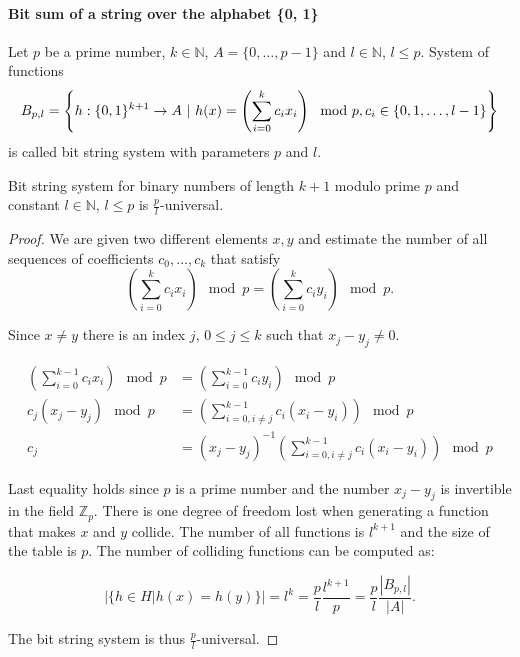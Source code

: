 \paragraph{Bit sum of a string over the alphabet \{0, 1\}}
\begin{definition}
Let $p$ be a prime number, $k \in \mathbb{N}$, $A = \{0, \dots, p - 1 \}$ and $l \in \mathbb{N}$, $l \leq p$. System of functions
\begin{displaymath}
B_{p, l} = \left\{ h: \{0, 1\}^{k + 1} \rightarrow A \ | \  h(x) = \left(\displaystyle \sum_{i=0}^{k} c_i x_i\right) \mod p, c_i \in \{0, 1, \dots, l - 1\} \right\}
\end{displaymath} 
is called bit string system with parameters $p$ and $l$.
\end{definition}

\begin{remark}
Bit string system for binary numbers of length $k + 1$ modulo prime $p$ and constant $l \in \mathbb{N}$, $l \leq p$ is $\frac{p}{l}$-universal.
\end{remark}
\begin{proof}
We are given two different elements $x, y$ and estimate the number of all sequences of coefficients $c_0, \dots, c_k$ that satisfy
\[
\left( \displaystyle \sum_{i = 0}^{k} c_i x_i \right) \mod p = \left( \displaystyle \sum_{i = 0}^{k} c_i y_i \right) \mod p \textit{.}
\]

Since $x \neq y$ there is an index $j$, $0 \leq j \leq k$ such that $x_j - y_j \neq 0$.

\begin{displaymath}
\begin{split}
\left(\displaystyle \sum_{i=0}^{k-1} c_i x_i\right) \mod p & = \left(\displaystyle \sum_{i=0}^{k-1} c_i y_i\right) \mod p \\
c_j(x_j - y_j) \mod p & = \left(\displaystyle \sum_{i=0, i \neq j}^{k-1} c_i (x_i - y_i)\right) \mod p \\
c_j & = (x_j - y_j) ^ {-1}\left(\displaystyle \sum_{i=0, i \neq j}^{k-1} c_i (x_i - y_i)\right) \mod p
\end{split}
\end{displaymath}

Last equality holds since $p$ is a prime number and the number $x_j - y_j$ is invertible in the field $\mathbb{Z}_p$. There is one degree of freedom lost when generating a function that makes $x$ and $y$ collide. The number of all functions is $l ^ {k + 1}$ and the size of the table is $p$. The number of colliding functions can be computed as:

\begin{displaymath}
|\{h \in H | h(x) = h(y) \}| = l^{k} = \frac{p}{l}\frac{l^{k + 1}}{p} = \frac{p}{l}\frac{|B_{p, l}|}{|A|} \textit{.}
\end{displaymath}

The bit string system is thus $\frac{p}{l}$-universal.
\end{proof}

